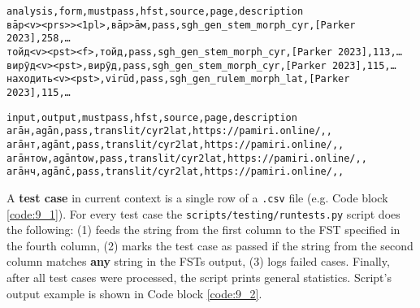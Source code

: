 \begin{code_frame}[float,floatplacement=!htbp]
    \begin{subbox}[title={A fragment of \texttt{scripts/testing/tests/verb.csv}},
                   width=15.5cm,height=3cm]
        \begin{footnotesize}\codespacing
        \begin{verbatim}
analysis,form,mustpass,hfst,source,page,description
вāр<v><prs>><1pl>,вāр>āм,pass,sgh_gen_stem_morph_cyr,[Parker 2023],258,…
тойд<v><pst><f>,тойд,pass,sgh_gen_stem_morph_cyr,[Parker 2023],113,…
вирӯд<v><pst>,вирӯд,pass,sgh_gen_stem_morph_cyr,[Parker 2023],115,…
находить<v><pst>,virūd,pass,sgh_gen_rulem_morph_lat,[Parker 2023],115,…
        \end{verbatim}
        \end{footnotesize}
    \end{subbox}
    \begin{subbox}[title={A fragment of \texttt{scripts/testing/tests/translit.csv}},
                   width=15.5cm,height=3cm]
        \begin{footnotesize}\codespacing
        \begin{verbatim}
input,output,mustpass,hfst,source,page,description
агāн,agān,pass,translit/cyr2lat,https://pamiri.online/,,
агāнт,agānt,pass,translit/cyr2lat,https://pamiri.online/,,
агāнтоw,agāntow,pass,translit/cyr2lat,https://pamiri.online/,,
агāнч,agānč,pass,translit/cyr2lat,https://pamiri.online/,,
        \end{verbatim}
        \end{footnotesize}
    \end{subbox}
    \tcblower
    \label{code:9_1}
\end{code_frame}

A \textbf{test case} in current context is a single row of a \texttt{.csv} file (e.g. Code block \ref{code:9_1}). For every test case the \texttt{scripts/testing/runtests.py} script does the following: (1) feeds the string from the first column to the FST specified in the fourth column, (2) marks the test case as passed if the string from the second column matches \textbf{any} string in the FSTs output, (3) logs failed cases. Finally, after all test cases were processed, the script prints general statistics. Script's output example is shown in Code block \ref{code:9_2}.

